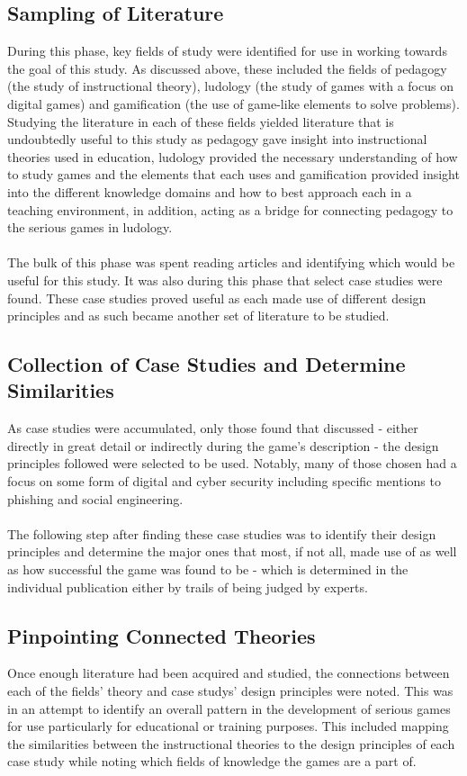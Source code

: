 \documentclass[conference]{IEEEtran}
\begin{document}
\subsection{Sampling of Literature}
During this phase, key fields of study were identified for use in working towards the goal of this study. As discussed above, these included the fields of pedagogy (the study of instructional theory), ludology (the study of games with a focus on digital games) and gamification (the use of game-like elements to solve problems). Studying the literature in each of these fields yielded literature that is undoubtedly useful to this study as pedagogy gave insight into instructional theories used in education, ludology provided the necessary understanding of how to study games and the elements that each uses and gamification provided insight into the different knowledge domains and how to best approach each in a teaching environment, in addition, acting as a bridge for connecting pedagogy to the serious games in ludology. 
\\\\
The bulk of this phase was spent reading articles and identifying which would be useful for this study. It was also during this phase that select case studies were found. These case studies proved useful as each made use of different design principles and as such became another set of literature to be studied.

\subsection{Collection of Case Studies and Determine Similarities}
As case studies were accumulated, only those found that discussed - either directly in great detail or indirectly during the game's description - the design principles followed were selected to be used. Notably, many of those chosen had a focus on some form of digital and cyber security including specific mentions to phishing and social engineering\cite{Sheng2007, Dincelli2020}. 
\\\\
The following step after finding these case studies was to identify their design principles and determine the major ones that most, if not all, made use of as well as how successful the game was found to be - which is determined in the individual publication either by trails of being judged by experts.

\subsection{Pinpointing Connected Theories}
Once enough literature had been acquired and studied, the connections between each of the fields' theory and case studys' design principles were noted. This was in an attempt to identify an overall pattern in the development of serious games for use particularly for educational or training purposes. This included mapping the similarities between the instructional theories to the design principles of each case study while noting which fields of knowledge the games are a part of.
\end{document}
